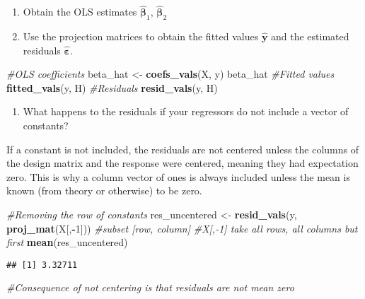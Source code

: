 \documentclass[]{book}
\newenvironment{Shaded}{\begin{snugshade}}{\end{snugshade}}
\newcommand{\CommentTok}[1]{\textcolor[rgb]{0.56,0.35,0.01}{\textit{#1}}}
\newcommand{\DecValTok}[1]{\textcolor[rgb]{0.00,0.00,0.81}{#1}}
\newcommand{\KeywordTok}[1]{\textcolor[rgb]{0.13,0.29,0.53}{\textbf{#1}}}
\newcommand{\NormalTok}[1]{#1}
\newcommand{\OperatorTok}[1]{\textcolor[rgb]{0.81,0.36,0.00}{\textbf{#1}}}
\newcommand{\StringTok}[1]{\textcolor[rgb]{0.31,0.60,0.02}{#1}}
\providecommand{\tightlist}{%
  \setlength{\itemsep}{0pt}\setlength{\parskip}{0pt}}
\theoremstyle{definition}
\theoremstyle{definition}
\theoremstyle{definition}
\theoremstyle{remark}
\begin{document}
\begin{enumerate}
\def\labelenumi{\alph{enumi}.}
\setcounter{enumi}{1}
\tightlist
\item
  Obtain the OLS estimates \(\widehat{\boldsymbol{\beta}}_1\), \(\widehat{\boldsymbol{\beta}}_2\)
\item
  Use the projection matrices to obtain the fitted values \(\widehat{\boldsymbol{y}}\) and the estimated residuals \(\widehat{\boldsymbol{\varepsilon}}\).
\end{enumerate}

\begin{Shaded}
\begin{Highlighting}[]
\CommentTok{#OLS coefficients}
\NormalTok{beta_hat <-}\StringTok{ }\KeywordTok{coefs_vals}\NormalTok{(X, y)}
\NormalTok{beta_hat}
\CommentTok{#Fitted values}
\KeywordTok{fitted_vals}\NormalTok{(y, H)}
\CommentTok{#Residuals}
\KeywordTok{resid_vals}\NormalTok{(y, H)}
\end{Highlighting}
\end{Shaded}

\begin{enumerate}
\def\labelenumi{\alph{enumi}.}
\setcounter{enumi}{3}
\tightlist
\item
  What happens to the residuals if your regressors do not include a vector of constants?
\end{enumerate}

If a constant is not included, the residuals are not centered unless the columns of the design matrix and the response were
centered, meaning they had expectation zero. This is why a column vector of ones is always included unless the mean is known
(from theory or otherwise) to be zero.

\begin{Shaded}
\begin{Highlighting}[]
\CommentTok{#Removing the row of constants}
\NormalTok{res_uncentered <-}\StringTok{ }\KeywordTok{resid_vals}\NormalTok{(y, }\KeywordTok{proj_mat}\NormalTok{(X[,}\OperatorTok{-}\DecValTok{1}\NormalTok{])) }\CommentTok{#subset [row, column]}
\CommentTok{#X[,-1] take all rows, all columns but first}
\KeywordTok{mean}\NormalTok{(res_uncentered)}
\end{Highlighting}
\end{Shaded}

\begin{verbatim}
## [1] 3.32711
\end{verbatim}

\begin{Shaded}
\begin{Highlighting}[]
\CommentTok{#Consequence of not centering is that residuals are not mean zero}
\end{Highlighting}
\end{Shaded}
\end{document}
